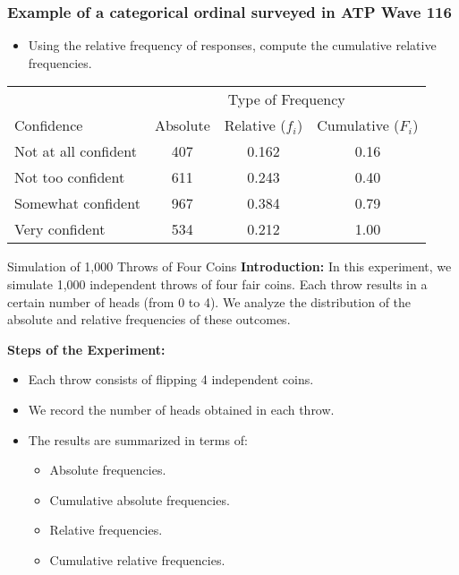 \documentclass[handout]{beamer} %
\begin{document}
\begin{frame}
\frametitle{Example of a categorical ordinal surveyed in ATP Wave 116}
\begin{itemize}
\item Using the relative frequency of responses, compute the cumulative relative frequencies.
\end{itemize}

\medskip

{\small \centering
\begin{tabular}{|l|c|c|c|}
\hline
& \multicolumn{3}{c|}{Type of Frequency} \\
\cline{2-4}
Confidence & Absolute & Relative ($f_i$) & Cumulative ($F_i$)  \\
\hline
Not at all confident & 407 & 0.162 & 0.16 \\
Not too confident & 611 & 0.243 & 0.40 \\
Somewhat confident & 967 & 0.384 & 0.79 \\
Very confident & 534 & 0.212 & 1.00 \\
\hline
\end{tabular}
\par}

\end{frame}

\begin{frame}{Simulation of 1,000 Throws of Four Coins}
    \textbf{Introduction:} In this experiment, we simulate 1,000 independent throws of four fair coins.
    Each throw results in a certain number of heads (from 0 to 4). We analyze the distribution of the
    absolute and relative frequencies of these outcomes.

    \vspace{1em}

    \textbf{Steps of the Experiment:}
    \begin{itemize}
        \item Each throw consists of flipping 4 independent coins.
        \item We record the number of heads obtained in each throw.
        \item The results are summarized in terms of:
        \begin{itemize}
            \item Absolute frequencies.
            \item Cumulative absolute frequencies.
            \item Relative frequencies.
            \item Cumulative relative frequencies.
        \end{itemize}
    \end{itemize}
\end{frame}
\end{document}
